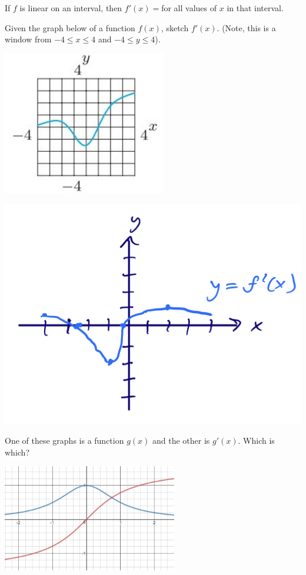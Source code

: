 \documentclass[11pt]{exam}
\begin{document}
\noindent
If $f$ is linear on an interval, then $f'(x) =$\fillin[constant] for all values of $x$ in that interval.
\begin{questions}
  \question  Given the graph below of a function $f(x)$, sketch
    $f'(x)$. (Note, this is a window from \(-4 \leq x \leq 4\) and
    \(-4 \leq y \leq 4\)).

    \includegraphics[width=2.8in]{deriv.jpg}
    \begin{solution}
     \includegraphics[scale=0.3]{no1sketch} 
    \end{solution}
  \question One of these graphs is a function $g(x)$ and the other is $g'(x)$.  Which is which?

    \includegraphics[width=3in]{arctan.jpg}	


\end{questions}
\end{document}
